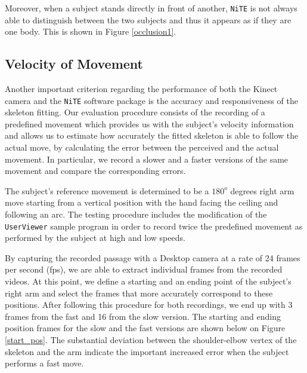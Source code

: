 \documentclass[11pt,a4paper]{article}
\begin{document}
\noindent
Moreover, when a subject stands directly in front of another, \texttt{NiTE} is not always able to distinguish between the two subjects and thus it appears as if they are one body. This is shown in Figure \ref{occlusion1}.

\subsection{Velocity of Movement}
Another important criterion regarding the performance of both the Kinect camera and the \texttt{NiTE} software package is the accuracy and responsiveness of the skeleton fitting. Our evaluation procedure consists of the recording of a predefined movement which provides us with the subject's velocity information and allows us to estimate how accurately the fitted skeleton is able to follow the actual move, by calculating the error between the perceived and the actual movement. In particular, we record a slower and a faster versions of the same movement and compare the corresponding errors.

\noindent
The subject's reference movement is determined to be a $180^o$ degrees right arm move starting from a vertical position with the hand facing the ceiling and following an arc. The testing procedure includes the modification of the \texttt{UserViewer} sample program in order to record twice the predefined movement as performed by the subject at high and low speeds. 
 
\noindent
By capturing the recorded passage with a Desktop camera at a rate of 24 frames per second (fps), we are able to extract individual frames from the recorded videos. At this point, we define a starting and an ending point of the subject's right arm and select the frames that more accurately correspond to these positions. After following this procedure for both recordings, we end up with 3 frames from the fast and 16 from the slow version. The starting and ending position frames for the slow and the fast versions are shown below on Figure \ref{start_pos}. The substantial deviation between the shoulder-elbow vertex of the skeleton and the arm indicate the important increased error when the subject performs a fast move.
\end{document}
